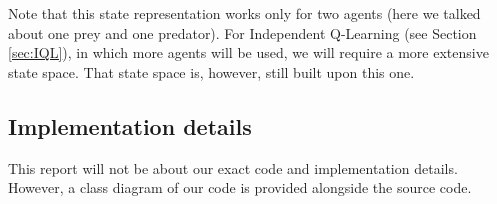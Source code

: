 Note that this state representation works only for two agents (here we talked about one prey and one predator). For Independent Q-Learning (see Section \ref{sec:IQL}), in which more agents will be used, we will require a more extensive state space. That state space is, however, still built upon this one.

\subsection{Implementation details}
This report will not be about our exact code and implementation details. However, a class diagram of our code is provided alongside the source code.
